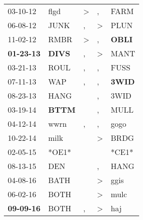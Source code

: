 \begin{supertabular}{p{0.07\textwidth}p{0.06\textwidth}p{0.02\textwidth}p{0.02\textwidth}p{0.06\textwidth}}
          03-10-12\textsuperscript{} &           flgd\textsuperscript{} &     \textgreater &             , &           FARM\textsuperscript{} \\
          06-08-12\textsuperscript{} &           JUNK\textsuperscript{} &                , &  \textgreater &           PLUN\textsuperscript{} \\
          11-02-12\textsuperscript{} &           RMBR\textsuperscript{} &     \textgreater &             , &  \textbf{OBLI\textsuperscript{}} \\
 \textbf{01-23-13\textsuperscript{}} &  \textbf{DIVS\textsuperscript{}} &                , &  \textgreater &           MANT\textsuperscript{} \\
          03-21-13\textsuperscript{} &           ROUL\textsuperscript{} &                , &             , &           FUSS\textsuperscript{} \\
          07-11-13\textsuperscript{} &            WAP\textsuperscript{} &                , &             , &  \textbf{3WID\textsuperscript{}} \\
          08-23-13\textsuperscript{} &           HANG\textsuperscript{} &                  &             , &           3WID\textsuperscript{} \\
          03-19-14\textsuperscript{} &  \textbf{BTTM\textsuperscript{}} &                  &             , &           MULL\textsuperscript{} \\
          04-12-14\textsuperscript{} &           wwrn\textsuperscript{} &                , &             , &           gogo\textsuperscript{} \\
          10-22-14\textsuperscript{} &           milk\textsuperscript{} &                  &  \textgreater &           BRDG\textsuperscript{} \\
          02-05-15\textsuperscript{} &                            *OE1* &                  &               &                            *CE1* \\
          08-13-15\textsuperscript{} &            DEN\textsuperscript{} &                  &             , &           HANG\textsuperscript{} \\
          04-08-16\textsuperscript{} &           BATH\textsuperscript{} &                  &  \textgreater &           ggis\textsuperscript{} \\
          06-02-16\textsuperscript{} &           BOTH\textsuperscript{} &                  &  \textgreater &           mulc\textsuperscript{} \\
 \textbf{09-09-16\textsuperscript{}} &           BOTH\textsuperscript{} &                , &  \textgreater &            haj\textsuperscript{} \\

\end{supertabular}
